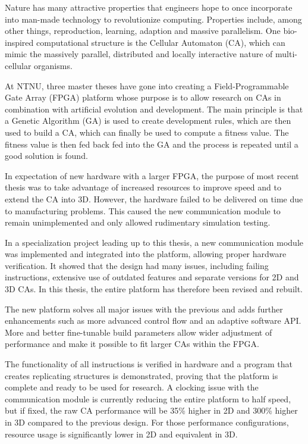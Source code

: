 Nature has many attractive properties that engineers hope to once incorporate into man-made technology to revolutionize computing.
Properties include, among other things, reproduction, learning, adaption and massive parallelism.
One bio-inspired computational structure is the Cellular Automaton (CA), which can mimic the massively parallel, distributed and locally interactive nature of multi-cellular organisms.

At NTNU, three master theses have gone into creating a Field-Programmable Gate Array (FPGA) platform whose purpose is to allow research on CAs in combination with artificial evolution and development.
The main principle is that a Genetic Algorithm (GA) is used to create development rules, which are then used to build a CA, which can finally be used to compute a fitness value.
The fitness value is then fed back fed into the GA and the process is repeated until a good solution is found.

In expectation of new hardware with a larger FPGA, the purpose of most recent thesis was to take advantage of increased resources to improve speed and to extend the CA into 3D.
However, the hardware failed to be delivered on time due to manufacturing problems.
This caused the new communication module to remain unimplemented and only allowed rudimentary simulation testing.

In a specialization project leading up to this thesis, a new communication module was implemented and integrated into the platform, allowing proper hardware verification.
It showed that the design had many issues, including failing instructions, extensive use of outdated features and separate versions for 2D and 3D CAs.
In this thesis, the entire platform has therefore been revised and rebuilt.

The new platform solves all major issues with the previous and adds further enhancements such as more advanced control flow and an adaptive software API.
More and better fine-tunable build parameters allow wider adjustment of performance and make it possible to fit larger CAs within the FPGA.

The functionality of all instructions is verified in hardware and a program that creates replicating structures is demonstrated, proving that the platform is complete and ready to be used for research.
A clocking issue with the communication module is currently reducing the entire platform to half speed, but if fixed, the raw CA performance will be 35\% higher in 2D and 300\% higher in 3D compared to the previous design.
For those performance configurations, resource usage is significantly lower in 2D and equivalent in 3D.
